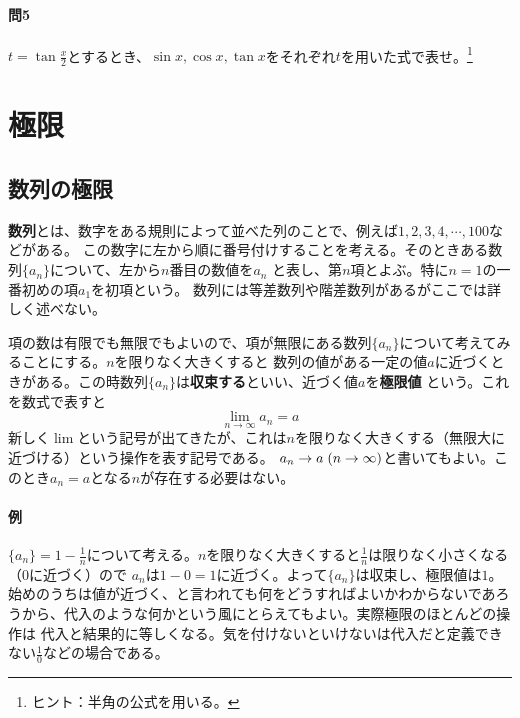 \documentclass[a4j,dvipdfmx]{jsarticle}
\begin{document}
                \paragraph{問5}$t=\tan\frac{x}{2}$とするとき、$\sin x,\cos x,\tan x$をそれぞれ$t$を用いた式で表せ。\footnote{ヒント：半角の公式を用いる。}
            \clearpage
            \section{極限}
            \subsection{数列の極限}
                \textbf{数列}とは、数字をある規則によって並べた列のことで、例えば$1,2,3,4,\cdots,100$などがある。
                この数字に左から順に番号付けすることを考える。そのときある数列$\{a_n\}$について、左から$n$番目の数値を$a_n$
                と表し、第$n$項とよぶ。特に$n=1$の一番初めの項$a_1$を初項という。
                数列には等差数列や階差数列があるがここでは詳しく述べない。

                項の数は有限でも無限でもよいので、項が無限にある数列$\{a_n\}$について考えてみることにする。$n$を限りなく大きくすると
                数列の値がある一定の値$a$に近づくときがある。この時数列$\{a_n\}$は\textbf{収束する}といい、近づく値$a$を\textbf{極限値}
                という。これを数式で表すと
                \begin{equation}
                    \lim_{n\to \infty}a_n=a
                \end{equation}
                新しく$\lim$という記号が出てきたが、これは$n$を限りなく大きくする（無限大に近づける）という操作を表す記号である。
                $a_n\to a \hspace{1mm}(n\to\infty)$と書いてもよい。このとき$a_n=a$となる$n$が存在する必要はない。
                
                \paragraph*{例}$\{a_n\}=1-\frac{1}{n}$について考える。$n$を限りなく大きくすると$\frac{1}{n}$は限りなく小さくなる（$0$に近づく）ので
                $a_n$は$1-0=1$に近づく。よって$\{a_n\}$は収束し、極限値は$1$。\\

                始めのうちは値が近づく、と言われても何をどうすればよいかわからないであろうから、代入のような何かという風にとらえてもよい。実際極限のほとんどの操作は
                代入と結果的に等しくなる。気を付けないといけないは代入だと定義できない$\frac{1}{0}$などの場合である。\\
\end{document}
